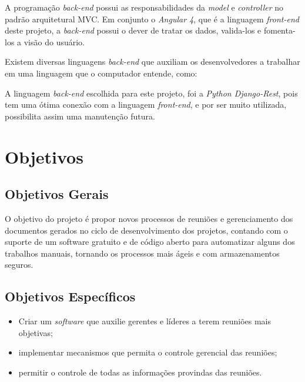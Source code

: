 A programação \textit{back-end} possui as responsabilidades da \textit{model} e \textit{controller} no padrão arquitetural MVC. Em conjunto o \textit{Angular 4}, que é a linguagem \textit{front-end} deste projeto, a \textit{back-end} possui o dever de tratar os dados, valida-los e fomenta-los
a visão do usuário.

Existem diversas linguagens \textit{back-end} que auxiliam os desenvolvedores a trabalhar em uma linguagem que o computador entende, como:


A linguagem \textit{back-end} escolhida para este projeto, foi a \textit{Python Django-Rest}, pois tem uma ótima conexão com a linguagem \textit{front-end}, e por ser muito utilizada, possibilita assim uma manutenção futura.

\section{Objetivos}
\label{sec:objetivos}

\subsection{Objetivos Gerais}
\label{sec:objetivos_gerais}

O objetivo do projeto é propor novos processos de reuniões e gerenciamento dos documentos gerados no ciclo de desenvolvimento dos projetos, contando com o suporte de um software gratuito e de código aberto para automatizar alguns dos trabalhos manuais, tornando os processos mais ágeis e com armazenamentos seguros.

\subsection{Objetivos Específicos}
\label{sec:objetivos_especificos}

\begin{itemize}
    \item Criar um \textit{software} que auxilie gerentes e líderes a terem reuniões mais objetivas;
    \item implementar mecanismos que permita o controle gerencial das reuniões;
    \item permitir o controle de todas as informações provindas das reuniões.
\end{itemize}